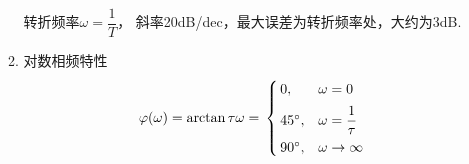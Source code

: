 \begin{enumerate}[1.]
\begin{enumerate}[(1) ]
		转折频率$\omega = \dfrac{1}{T}$， 斜率20dB/dec，最大误差为转折频率处，大约为3dB.
		\item 对数相频特性
		\vspace*{-0.5em}
		\begin{align}
			\varphi(\omega) =  \arctan \tau \omega = \,
			\begin{cases}
				\, 0, & \omega = 0\\[0.5em]
				\, 45{}^{\circ} , & \omega = \dfrac{1}{\tau}\\[0.5em]
				\, 90 {}^{\circ}, & \omega \to \infty
			\end{cases}
		\end{align}
		\vspace*{-3em}
	\end{enumerate}
\end{enumerate}

